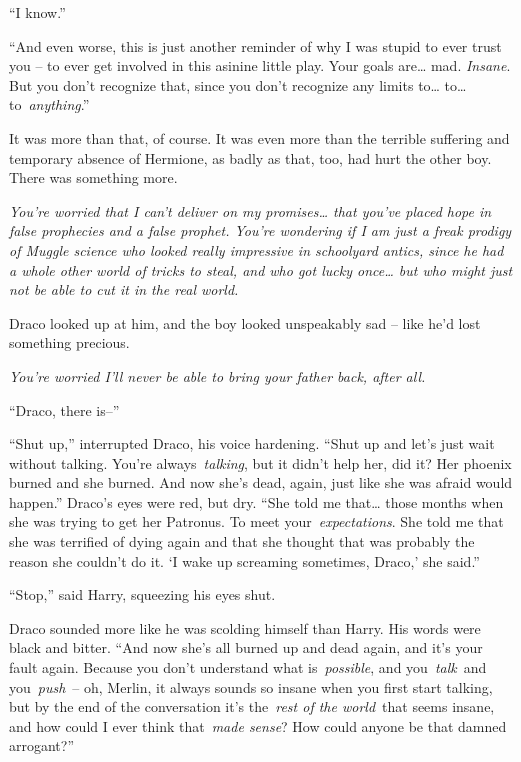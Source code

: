 ``I know.''

``And even worse, this is just another reminder of why I was stupid to
ever trust you -- to ever get involved in this asinine little play. Your
goals are\ldots{} mad. \emph{Insane}. But you don't recognize that,
since you don't recognize any limits to\ldots{} to\ldots{}
to~\emph{anything}.''

It was more than that, of course. It was even more than the terrible
suffering and temporary absence of Hermione, as badly as that, too, had
hurt the other boy. There was something more.

\emph{You're worried that I can't deliver on my promises\ldots{} that
you've placed hope in false prophecies and a false prophet. You're
wondering if I am just a freak prodigy of Muggle science who looked
really impressive in schoolyard antics, since he had a whole other world
of tricks to steal, and who got lucky once\ldots{} but who might just
not be able to cut it in the real world.}

Draco looked up at him, and the boy looked unspeakably sad -- like he'd
lost something precious.

\emph{You're worried I'll never be able to bring your father back, after
all.}

``Draco, there is--''

``Shut up,'' interrupted Draco, his voice hardening. ``Shut up and let's
just wait without talking. You're always~\emph{talking}, but it didn't
help her, did it? Her phoenix burned and she burned. And now she's dead,
again, just like she was afraid would happen.'' Draco's eyes were red,
but dry. ``She told me that\ldots{} those months when she was trying to
get her Patronus. To meet your~\emph{expectations}. She told me that she
was terrified of dying again and that she thought that was probably the
reason she couldn't do it. `I wake up screaming sometimes, Draco,' she
said.''

``Stop,'' said Harry, squeezing his eyes shut.

Draco sounded more like he was scolding himself than Harry. His words
were black and bitter. ``And now she's all burned up and dead again, and
it's your fault again. Because you don't understand what
is~\emph{possible}, and you~\emph{talk}~and you~\emph{push}~-- oh,
Merlin, it always sounds so insane when you first start talking, but by
the end of the conversation it's the~\emph{rest of the world}~that seems
insane, and how could I ever think that~\emph{made sense}? How could
anyone be that damned arrogant?''


